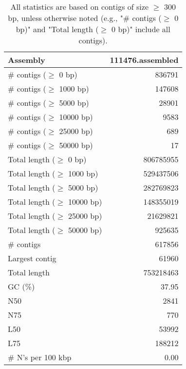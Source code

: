 \documentclass[12pt,a4paper]{article}
\begin{document}
\begin{table}[ht]
\begin{center}
\caption{All statistics are based on contigs of size $\geq$ 300 bp, unless otherwise noted (e.g., "\# contigs ($\geq$ 0 bp)" and "Total length ($\geq$ 0 bp)" include all contigs).}
\begin{tabular}{|l*{1}{|r}|}
\hline
Assembly & 111476.assembled \\ \hline
\# contigs ($\geq$ 0 bp) & 836791 \\ \hline
\# contigs ($\geq$ 1000 bp) & 147608 \\ \hline
\# contigs ($\geq$ 5000 bp) & 28901 \\ \hline
\# contigs ($\geq$ 10000 bp) & 9583 \\ \hline
\# contigs ($\geq$ 25000 bp) & 689 \\ \hline
\# contigs ($\geq$ 50000 bp) & 17 \\ \hline
Total length ($\geq$ 0 bp) & 806785955 \\ \hline
Total length ($\geq$ 1000 bp) & 529437506 \\ \hline
Total length ($\geq$ 5000 bp) & 282769823 \\ \hline
Total length ($\geq$ 10000 bp) & 148355019 \\ \hline
Total length ($\geq$ 25000 bp) & 21629821 \\ \hline
Total length ($\geq$ 50000 bp) & 925635 \\ \hline
\# contigs & 617856 \\ \hline
Largest contig & 61960 \\ \hline
Total length & 753218463 \\ \hline
GC (\%) & 37.95 \\ \hline
N50 & 2841 \\ \hline
N75 & 770 \\ \hline
L50 & 53992 \\ \hline
L75 & 188212 \\ \hline
\# N's per 100 kbp & 0.00 \\ \hline
\end{tabular}
\end{center}
\end{table}
\end{document}
